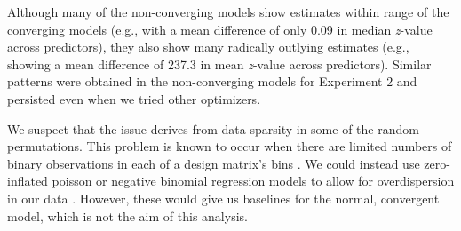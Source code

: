 \documentclass[authoryear, 12pt]{elsarticle}
\begin{document}
Although many of the non-converging models show estimates within range of the converging models (e.g., with a mean difference of only 0.09 in median \textit{z}-value across predictors), they also show many radically outlying estimates (e.g., showing a mean difference of 237.3 in mean \textit{z}-value across predictors). Similar patterns were obtained in the non-converging models for Experiment 2 and persisted even when we tried other optimizers.

We suspect that the issue derives from data sparsity in some of the random permutations. This problem is known to occur when there are limited numbers of binary observations in each of a design matrix's bins \citep{allison2004}. We could instead use zero-inflated poisson or negative binomial regression models to allow for overdispersion in our data \citep{allison2012}. However, these would give us baselines for the normal, convergent model, which is not the aim of this analysis.
\end{document}
